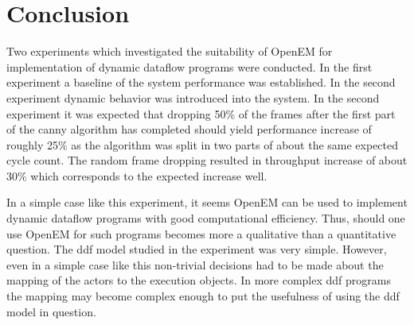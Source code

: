 \documentclass[a4paper,10pt]{article}
\begin{document}
\section{Conclusion}
Two experiments which investigated the suitability of OpenEM for implementation of dynamic dataflow programs were conducted. In the first experiment a baseline of the system performance was established. In the second experiment dynamic behavior was introduced into the system. In the second experiment it was expected that dropping 50\% of the frames after the first part of the canny algorithm has completed should yield performance increase of roughly 25\% as the algorithm was split in two parts of about the same expected cycle count. The random frame dropping resulted in throughput increase of about 30\% which corresponds to the expected increase well.

In a simple case like this experiment, it seems OpenEM can be used to implement dynamic dataflow programs with good computational efficiency. Thus, should one use OpenEM for such programs becomes more a qualitative than a quantitative question. The ddf model studied in the experiment was very simple. However, even in a simple case like this non-trivial decisions had to be made about the mapping of the actors to the execution objects. In more complex ddf programs the mapping may become complex enough to put the usefulness of using the ddf model in question.



\end{document}
